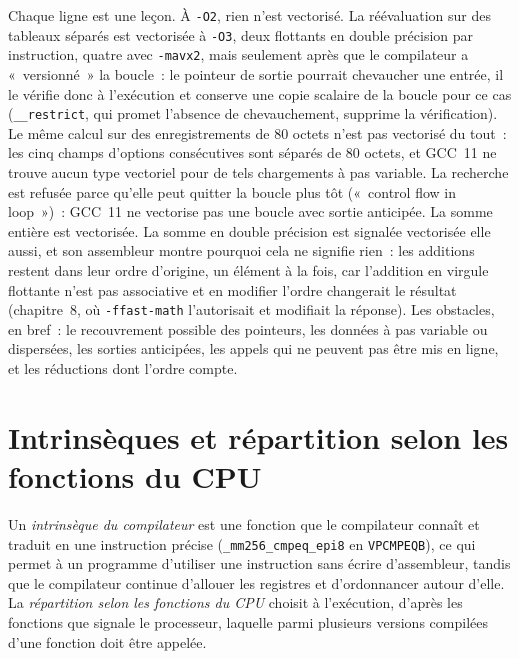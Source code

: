 Chaque ligne est une leçon. À \texttt{-O2}, rien n'est vectorisé. La réévaluation sur des tableaux séparés est vectorisée à
\texttt{-O3}, deux flottants en double précision par instruction, quatre avec \texttt{-mavx2}, mais seulement après que le compilateur a «~versionné~» la boucle~:
le pointeur de sortie pourrait chevaucher une entrée, il le vérifie donc à l'exécution et conserve une copie scalaire de la boucle pour ce cas
(\texttt{\_\_restrict}, qui promet l'absence de chevauchement, supprime la vérification). Le même calcul sur des enregistrements de 80 octets n'est
pas vectorisé du tout~: les cinq champs d'options consécutives sont séparés de 80 octets, et GCC~11 ne trouve aucun type vectoriel pour de tels
chargements à pas variable. La recherche est refusée parce qu'elle peut quitter la boucle plus tôt («~control flow in loop~»)~: GCC~11 ne vectorise pas une boucle
avec sortie anticipée. La somme entière est vectorisée. La somme en double précision est signalée
vectorisée elle aussi, et son assembleur montre pourquoi cela ne signifie rien~: les additions restent dans leur ordre d'origine, un élément à la
fois, car l'addition en virgule flottante n'est pas associative et en modifier l'ordre changerait le résultat (chapitre~8, où
\texttt{-ffast-math} l'autorisait et modifiait la réponse). Les obstacles, en bref~: le recouvrement possible des pointeurs, les données à pas variable ou dispersées,
les sorties anticipées, les appels qui ne peuvent pas être mis en ligne, et les réductions dont l'ordre compte.

\section{Intrinsèques et répartition selon les fonctions du CPU}

\begin{definition}\label{def:ll:vector-instructions-and-data-parallel-code:intrinsic}
Un \emph{intrinsèque du compilateur} est une fonction que le compilateur connaît et traduit en une instruction précise
(\texttt{\_mm256\_cmpeq\_epi8} en \texttt{VPCMPEQB}), ce qui permet à un programme d'utiliser une instruction sans écrire
d'assembleur, tandis que le compilateur continue d'allouer les registres et d'ordonnancer autour d'elle. La \emph{répartition selon les
fonctions du CPU} choisit à l'exécution, d'après les fonctions que signale le processeur, laquelle parmi plusieurs versions compilées d'une fonction
doit être appelée.
\end{definition}

